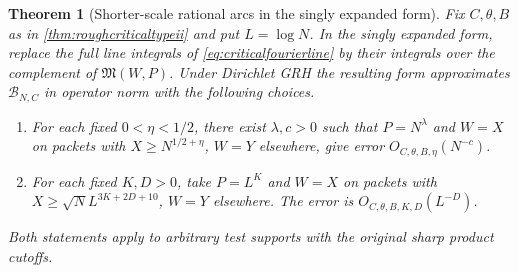\documentclass[11pt,a4paper]{article}
\numberwithin{equation}{section}
\newtheorem{theorem}{Theorem}[section]
\begin{document}
\begin{theorem}[Shorter-scale rational arcs in the singly expanded form]
\label{thm:shortscalecriticalarcs}
Fix $C,\theta,B$ as in \cref{thm:roughcriticaltypeii}
and put $L=\log N$. In the singly expanded form,
replace the full line integrals of
\cref{eq:criticalfourierline} by their integrals over
the complement of $\mathfrak M(W,P)$. Under Dirichlet
GRH the resulting form approximates $\mathcal B_{N,C}$
in operator norm with the following choices.
\begin{enumerate}
\item For each fixed $0<\eta<1/2$, there exist
      $\lambda,c>0$ such that $P=N^\lambda$ and
      $W=X$ on packets with $X\ge N^{1/2+\eta}$,
      $W=Y$ elsewhere, give error $O_{C,\theta,B,\eta}(N^{-c})$.
\item For each fixed $K,D>0$, take $P=L^K$ and
      $W=X$ on packets with $X\ge\sqrt N L^{3K+2D+10}$,
      $W=Y$ elsewhere. The error is
      $O_{C,\theta,B,K,D}(L^{-D})$.
\end{enumerate}
Both statements apply to arbitrary test supports with
the original sharp product cutoffs.
\end{theorem}
\end{document}
